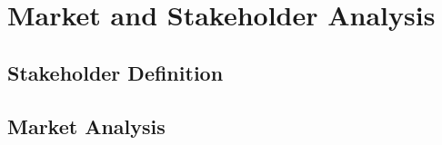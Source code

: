 \chapter{Market and Stakeholder Analysis}
\setlength{\parindent}{15pt}
\label{ch:mark_stak_anal}

\section{Stakeholder Definition}
\label{sec:stak_defi}


\section{Market Analysis}
\label{ec:mark_anal}

